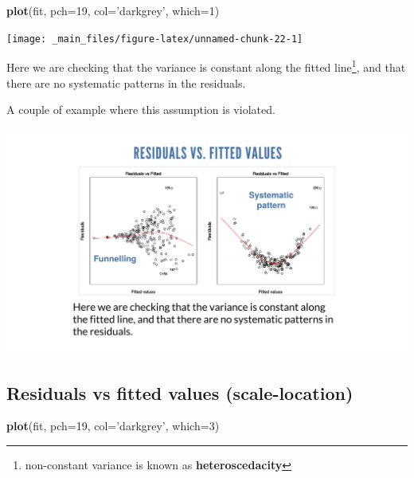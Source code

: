 \documentclass[]{book}
\newenvironment{Shaded}{\begin{snugshade}}{\end{snugshade}}
\newcommand{\KeywordTok}[1]{\textcolor[rgb]{0.13,0.29,0.53}{\textbf{#1}}}
\newcommand{\DataTypeTok}[1]{\textcolor[rgb]{0.13,0.29,0.53}{#1}}
\newcommand{\DecValTok}[1]{\textcolor[rgb]{0.00,0.00,0.81}{#1}}
\newcommand{\StringTok}[1]{\textcolor[rgb]{0.31,0.60,0.02}{#1}}
\newcommand{\NormalTok}[1]{#1}
\let\rmarkdownfootnote\footnote%
\def\footnote{\protect\rmarkdownfootnote}
\theoremstyle{definition}
\theoremstyle{definition}
\theoremstyle{definition}
\theoremstyle{remark}
\begin{document}
\begin{Shaded}
\begin{Highlighting}[]
\KeywordTok{plot}\NormalTok{(fit, }\DataTypeTok{pch=}\DecValTok{19}\NormalTok{, }\DataTypeTok{col=}\StringTok{'darkgrey'}\NormalTok{, }\DataTypeTok{which=}\DecValTok{1}\NormalTok{)}
\end{Highlighting}
\end{Shaded}

\begin{center}\texttt{[image: \_main\_files/figure-latex/unnamed-chunk-22-1]} \end{center}

Here we are checking that the variance is constant along the fitted
line\footnote{non-constant variance is known as \textbf{heteroscedacity}},
and that there are no systematic patterns in the residuals.

A couple of example where this assumption is violated.

\begin{center}\includegraphics[width=0.9\linewidth]{_img/02-funnel} \end{center}

\subsection{Residuals vs fitted values
(scale-location)}\label{residuals-vs-fitted-values-scale-location}

\begin{Shaded}
\begin{Highlighting}[]
\KeywordTok{plot}\NormalTok{(fit, }\DataTypeTok{pch=}\DecValTok{19}\NormalTok{, }\DataTypeTok{col=}\StringTok{'darkgrey'}\NormalTok{, }\DataTypeTok{which=}\DecValTok{3}\NormalTok{)}
\end{Highlighting}
\end{Shaded}
\end{document}
